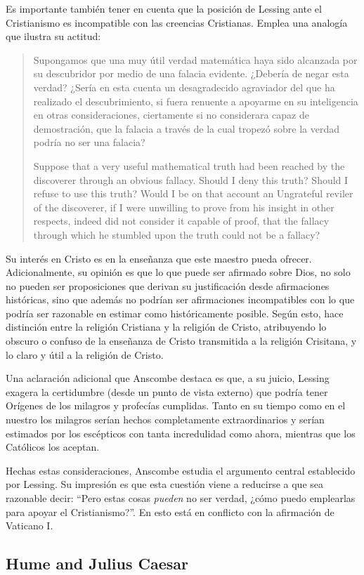 Es importante también tener en cuenta que la posición de Lessing ante el
Cristianismo es incompatible con las creencias Cristianas. Emplea una analogía
que ilustra su actitud: \blockquote[Suppose that a very useful mathematical
truth had been reached by the discoverer through an obvious fallacy. \textelp{}
Should I deny this truth? Should I refuse to use this truth? Would I be on that
account an Ungrateful reviler of the discoverer, if I were unwilling to prove
from his insight in other respects, indeed did not consider it capable of proof,
that the fallacy through which he stumbled upon the truth could not be a
fallacy?]{Supongamos que una muy útil verdad matemática haya sido alcanzada por
  su descubridor por medio de una falacia evidente. \textelp{} ¿Debería de negar
  esta verdad? ¿Sería en esta cuenta un desagradecido agraviador del que ha
  realizado el descubrimiento, si fuera renuente a apoyarme en su inteligencia
  en otras consideraciones, ciertamente si no considerara capaz de demostración,
  que la falacia a través de la cual tropezó sobre la verdad podría no ser una
  falacia?} Su interés en Cristo es en la enseñanza que este maestro pueda
ofrecer. Adicionalmente, su opinión es que lo que puede ser afirmado sobre Dios,
no solo no pueden ser proposiciones que derivan su justificación desde
afirmaciones históricas, sino que además no podrían ser afirmaciones
incompatibles con lo que podría ser razonable en estimar como históricamente
posible. Según esto, hace distinción entre la religión Cristiana y la religión
de Cristo, atribuyendo lo obscuro o confuso de la enseñanza de Cristo
transmitida a la religión Crisitana, y lo claro y útil a la religión de Cristo.

Una aclaración adicional que Anscombe destaca es que, a su juicio, Lessing
exagera la certidumbre (desde un punto de vista externo) que podría tener
Orígenes de los milagros y profecías cumplidas. Tanto en su tiempo como en el
nuestro los milagros serían hechos completamente extraordinarios y serían
estimados por los escépticos con tanta incredulidad como ahora, mientras que los
Católicos los aceptan.

Hechas estas consideraciones, Anscombe estudia el argumento central establecido
por Lessing. Su impresión es que esta cuestión viene a reducirse a que sea
razonable decir: \enquote{Pero estas cosas \emph{pueden} no ser verdad, ¿cómo
  puedo emplearlas para apoyar el Cristianismo?}. En esto está en conflicto con
la afirmación de Vaticano I.

\subsection{Hume and Julius Caesar}

